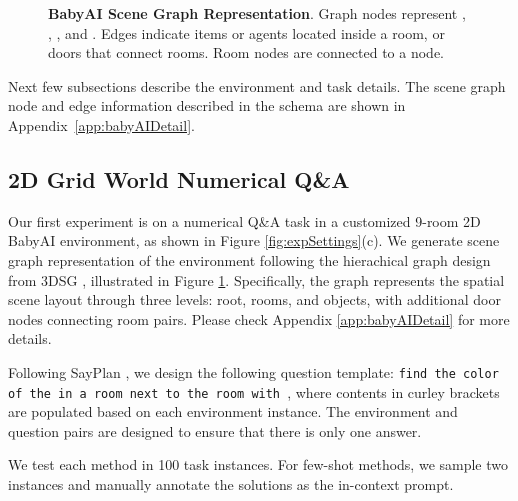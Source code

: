 \begin{figure}[t!]
    \centering
    \vspace*{-0pt}
    \vspace*{-15pt}
    \caption{
        \textbf{BabyAI Scene Graph Representation}. Graph nodes represent , , , and . Edges indicate items or agents located inside a  room, or doors that connect rooms. Room nodes are connected to a  node.
    }
    \label{fig:BabyAISG}
    \vspace*{-10pt}
\end{figure}

Next few subsections describe the environment and task details. The scene graph node and edge information described in the schema are shown in Appendix~\ref{app:babyAIDetail}.

\subsection{2D Grid World Numerical Q\&A}
Our first experiment is on a numerical Q\&A task in a customized 9-room 2D BabyAI \citep{babyai} environment, as shown in Figure \ref{fig:expSettings}(c).
We generate scene graph representation of the environment following the hierachical graph design from 3DSG \citep{3dsg}, illustrated in Figure \ref{fig:BabyAISG}. Specifically, the graph represents the spatial scene layout through three levels: root, rooms, and objects, with additional door nodes connecting room pairs.
Please check Appendix \ref{app:babyAIDetail} for more details.
 
Following SayPlan \citep{sayplan}, we design the following question template: \texttt{\small find the color of the  in a room next to the room with   }, where contents in curley brackets are populated based on each environment instance. 
The environment and question pairs are designed to ensure that there is only one answer.

We test each method in 100 task instances. For few-shot methods, we sample two instances and manually annotate the solutions as the in-context prompt. 

